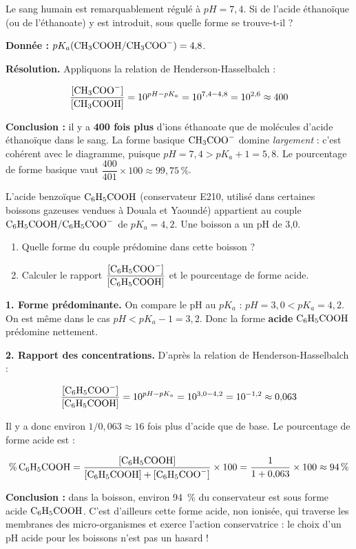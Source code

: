 \documentclass[11pt]{article}
\begin{document}
\begin{exemplebox}
Le sang humain est remarquablement régulé à $pH = 7{,}4$. Si de l'acide éthanoïque (ou de l'éthanoate) y est introduit, sous quelle forme se trouve-t-il ?

\textbf{Donnée :} $pK_a(\ce{CH3COOH}/\ce{CH3COO-}) = 4{,}8$.

\textbf{Résolution.} Appliquons la relation de Henderson-Hasselbalch :

\[ \frac{[\ce{CH3COO-}]}{[\ce{CH3COOH}]} = 10^{pH - pK_a} = 10^{7{,}4 - 4{,}8} = 10^{2{,}6} \approx 400 \]

\textbf{Conclusion :} il y a \textbf{400 fois plus} d'ions éthanoate que de molécules d'acide éthanoïque dans le sang. La forme basique $\ce{CH3COO-}$ domine \emph{largement} : c'est cohérent avec le diagramme, puisque $pH = 7{,}4 > pK_a + 1 = 5{,}8$. Le pourcentage de forme basique vaut $\dfrac{400}{401} \times 100 \approx 99{,}75\,\%$.
\end{exemplebox}

\begin{exoresolu}
L'acide benzoïque $\ce{C6H5COOH}$ (conservateur E210, utilisé dans certaines boissons gazeuses vendues à Douala et Yaoundé) appartient au couple $\ce{C6H5COOH}/\ce{C6H5COO-}$ de $pK_a = 4{,}2$. Une boisson a un pH de 3,0.
\begin{enumerate}
\item Quelle forme du couple prédomine dans cette boisson ?
\item Calculer le rapport $\dfrac{[\ce{C6H5COO-}]}{[\ce{C6H5COOH}]}$ et le pourcentage de forme acide.
\end{enumerate}
\tcblower
\textbf{1. Forme prédominante.} On compare le pH au $pK_a$ : $pH = 3{,}0 < pK_a = 4{,}2$. On est même dans le cas $pH < pK_a - 1 = 3{,}2$. Donc la forme \textbf{acide} $\ce{C6H5COOH}$ prédomine nettement.

\textbf{2. Rapport des concentrations.} D'après la relation de Henderson-Hasselbalch :

\[ \frac{[\ce{C6H5COO-}]}{[\ce{C6H5COOH}]} = 10^{pH - pK_a} = 10^{3{,}0 - 4{,}2} = 10^{-1{,}2} \approx 0{,}063 \]

Il y a donc environ $1/0{,}063 \approx 16$ fois plus d'acide que de base. Le pourcentage de forme acide est :

\[ \%\,\ce{C6H5COOH} = \frac{[\ce{C6H5COOH}]}{[\ce{C6H5COOH}] + [\ce{C6H5COO-}]} \times 100 = \frac{1}{1 + 0{,}063} \times 100 \approx 94\,\% \]

\textbf{Conclusion :} dans la boisson, environ 94 \,\% du conservateur est sous forme acide $\ce{C6H5COOH}$. C'est d'ailleurs cette forme acide, non ionisée, qui traverse les membranes des micro-organismes et exerce l'action conservatrice : le choix d'un pH acide pour les boissons n'est pas un hasard !
\end{exoresolu}
\end{document}
